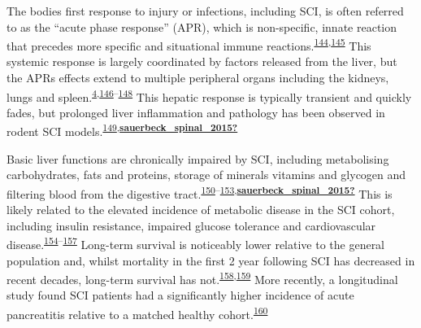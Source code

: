 \documentclass[
]{article}
\begin{document}
The bodies first response to injury or infections, including SCI, is often referred to as the ``acute phase response'' (APR), which is non-specific, innate reaction that precedes more specific and situational immune reactions.\textsuperscript{\protect\hyperlink{ref-gordon_acute-phase_1985}{144},\protect\hyperlink{ref-gruys_acute_2005}{145}}
This systemic response is largely coordinated by factors released from the liver, but the APRs effects extend to multiple peripheral organs including the kidneys, lungs and spleen.\textsuperscript{\protect\hyperlink{ref-gris_systemic_2008}{4},\protect\hyperlink{ref-bao_systemic_2012}{146}--\protect\hyperlink{ref-fleming_remote_2012}{148}}
This hepatic response is typically transient and quickly fades, but prolonged liver inflammation and pathology has been observed in rodent SCI models.\textsuperscript{\protect\hyperlink{ref-goodus_dietary_2018}{149},\protect\hyperlink{ref-sauerbeck_spinal_2015}{\textbf{sauerbeck\_spinal\_2015?}}}

Basic liver functions are chronically impaired by SCI, including metabolising carbohydrates, fats and proteins, storage of minerals vitamins and glycogen and filtering blood from the digestive tract.\textsuperscript{\protect\hyperlink{ref-garcia-lopez_acute_2007}{150}--\protect\hyperlink{ref-chow_pharmacology_2012}{153},\protect\hyperlink{ref-sauerbeck_spinal_2015}{\textbf{sauerbeck\_spinal\_2015?}}}
This is likely related to the elevated incidence of metabolic disease in the SCI cohort, including insulin resistance, impaired glucose tolerance and cardiovascular disease.\textsuperscript{\protect\hyperlink{ref-bauman_carbohydrate_2001}{154}--\protect\hyperlink{ref-myers_cardiovascular_2007}{157}}
Long-term survival is noticeably lower relative to the general population and, whilst mortality in the first 2 year following SCI has decreased in recent decades, long-term survival has not.\textsuperscript{\protect\hyperlink{ref-strauss_trends_2006}{158},\protect\hyperlink{ref-shavelle_improvements_2015}{159}}
More recently, a longitudinal study found SCI patients had a significantly higher incidence of acute pancreatitis relative to a matched healthy cohort.\textsuperscript{\protect\hyperlink{ref-ho_increased_2021}{160}}
\end{document}
